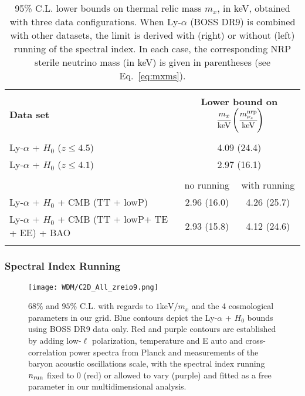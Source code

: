 \begin{table}
\begin{center}
\begin{tabular}{lcc}
\hline \\[-10pt]
\textbf{Data set} & \multicolumn{2}{c}{ \textbf{Lower bound on $\; \cfrac{m_x}{\mathrm{keV}} \left( \cfrac{m^{\mathrm{nrp}}_{\nu_s}}{\mathrm{keV}} \right)$}}\\[2pt]
\hline \\[-10pt]
Ly-$\alpha$ + $H_0$ ($z \leq 4.5$) & \multicolumn{2}{c}{4.09 (24.4)} \\[2pt]
Ly-$\alpha$ + $H_0$ ($z \leq 4.1$) & \multicolumn{2}{c}{ 2.97 (16.1)} \\[2pt]
\hline \\[-10pt]
 & no running & with running\\[2pt]
Ly-$\alpha$ + $H_0$ + CMB {\scriptsize (TT + lowP)} & 2.96 (16.0) & 4.26 (25.7)\\[2pt]
Ly-$\alpha$ + $H_0$ + CMB {\scriptsize (TT + lowP+ TE + EE)} + BAO & 2.93 (15.8) & 4.12 (24.6)\\[2pt]
\hline \\[-10pt]
\end{tabular}
\end{center}
\caption{95\% C.L. lower bounds on thermal relic mass $m_x$, in keV, obtained with three data configurations. When Ly-$\alpha$ (BOSS DR9) is combined with other datasets, the limit is derived  with (right) or without (left) running of the spectral index. In each case, the corresponding NRP sterile neutrino mass (in keV) is given in parentheses (see Eq.~\ref{eq:mxms}).}
\label{tab:CL95_1D}
\end{table}


\subsubsection{Spectral Index Running}

\begin{figure}
\begin{center}
\texttt{[image: WDM/C2D\_All\_zreio9.png]}
\caption{$68\%$ and $95\%$ C.L. with regards to $1 \mathrm{keV} / m_x$ and the 4 cosmological parameters in our grid. Blue contours depict the Ly-$\alpha$ + $H_0$ bounds using BOSS DR9 data only. Red and purple contours are established by adding low-$\ell$ polarization, temperature and E auto and cross-correlation power spectra from Planck and measurements of the baryon acoustic oscillations scale, with the spectral index running $n_{\rm run}$ fixed to 0 (red) or allowed to vary (purple) and fitted as a free parameter in our multidimensional analysis.}
\label{fig:Contour_nrun}
\end{center}
\end{figure}

